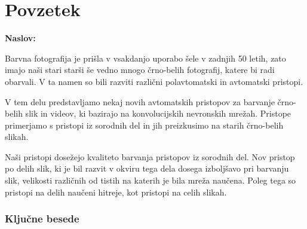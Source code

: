 \chapter*{Povzetek}

\noindent\textbf{Naslov:} \ttitle
\bigskip

Barvna fotografija je prišla v vsakdanjo uporabo šele v zadnjih 50 letih, zato imajo naši stari starši še vedno mnogo črno-belih fotografij, katere bi radi obarvali. V ta namen so bili razviti različni polavtomatski in avtomatski pristopi. 

V tem delu predstavljamo nekaj novih avtomatskih pristopov za barvanje črno-belih slik in videov, ki bazirajo na konvolucijskih nevronskih mrežah. Pristope primerjamo s pristopi iz sorodnih del in jih preizkusimo na starih črno-belih slikah. 

Naši pristopi dosežejo kvaliteto barvanja pristopov iz sorodnih del. Nov pristop po delih slik, ki je bil razvit v okviru tega dela dosega izboljšavo pri barvanju slik, velikosti različnih od tistih na katerih je bila mreža naučena. Poleg tega so pristopi na delih naučeni hitreje, kot pristopi na celih slikah. 

\subsection*{Ključne besede}
\textit{\tkeywords}
\clearemptydoublepage